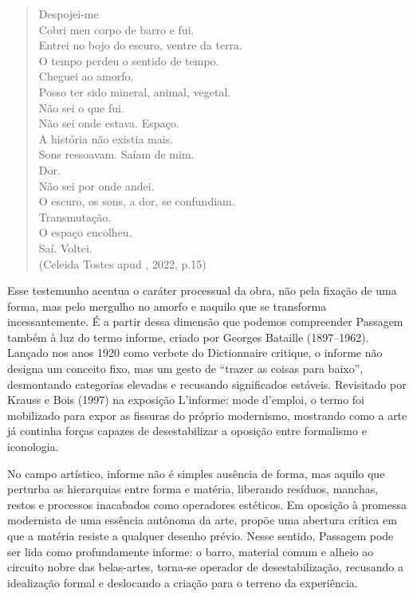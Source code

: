 \begin{quote}
  Despojei-me\\
  Cobri meu corpo de barro e fui.\\
  Entrei no bojo do escuro, ventre da terra.\\
  O tempo perdeu o sentido de tempo.\\
  Cheguei ao amorfo.\\
  Posso ter sido mineral, animal, vegetal.\\
  Não sei o que fui.\\
  Não sei onde estava. Espaço.\\
  A história não existia mais.\\
  Sons ressoavam. Saíam de mim.\\
  Dor.\\
  Não sei por onde andei.\\
  O escuro, os sons, a dor, se confundiam.\\
  Transmutação.\\
  O espaço encolheu.\\
  Saí. Voltei.\\
  (Celeida Tostes apud \citeauthor{dutraPalcoAoBarro2022}, 2022, p.15)
\end{quote}

Esse testemunho acentua o caráter processual da obra, não pela fixação de uma forma, mas pelo mergulho no amorfo e naquilo que se transforma incessantemente. É a partir dessa dimensão que podemos compreender Passagem também à luz do termo informe, criado por Georges Bataille (1897–1962). Lançado nos anos 1920 como verbete do Dictionnaire critique, o informe não designa um conceito fixo, mas um gesto de “trazer as coisas para baixo”, desmontando categorias elevadas e recusando significados estáveis. Revisitado por Krauss e Bois (1997) na exposição L’informe: mode d’emploi, o termo foi mobilizado para expor as fissuras do próprio modernismo, mostrando como a arte já continha forças capazes de desestabilizar a oposição entre formalismo e iconologia.

No campo artístico, informe não é simples ausência de forma, mas aquilo que perturba as hierarquias entre forma e matéria, liberando resíduos, manchas, restos e processos inacabados como operadores estéticos. Em oposição à promessa modernista de uma essência autônoma da arte, propõe uma abertura crítica em que a matéria resiste a qualquer desenho prévio. Nesse sentido, Passagem pode ser lida como profundamente informe: o barro, material comum e alheio ao circuito nobre das belas-artes, torna-se operador de desestabilização, recusando a idealização formal e deslocando a criação para o terreno da experiência.

